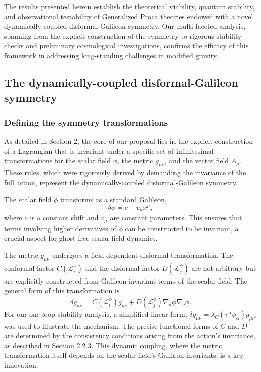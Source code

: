 \documentclass[twocolumn]{aastex631}
\begin{document}
The results presented herein establish the theoretical viability, quantum stability, and observational testability of Generalized Proca theories endowed with a novel dynamically-coupled disformal-Galileon symmetry. Our multi-faceted analysis, spanning from the explicit construction of the symmetry to rigorous stability checks and preliminary cosmological investigations, confirms the efficacy of this framework in addressing long-standing challenges in modified gravity.

\subsection{The dynamically-coupled disformal-Galileon symmetry}

\subsubsection{Defining the symmetry transformations}
As detailed in Section 2, the core of our proposal lies in the explicit construction of a Lagrangian that is invariant under a specific set of infinitesimal transformations for the scalar field $\phi$, the metric $g_{\mu\nu}$, and the vector field $A_\mu$. These rules, which were rigorously derived by demanding the invariance of the full action, represent the dynamically-coupled disformal-Galileon symmetry.

The scalar field $\phi$ transforms as a standard Galileon,
\begin{equation}
\delta \phi = c + v_\mu x^\mu,
\end{equation}
where $c$ is a constant shift and $v_\mu$ are constant parameters. This ensures that terms involving higher derivatives of $\phi$ can be constructed to be invariant, a crucial aspect for ghost-free scalar field dynamics.

The metric $g_{\mu\nu}$ undergoes a field-dependent disformal transformation. The conformal factor $C(\mathcal{L}_i^\phi)$ and the disformal factor $D(\mathcal{L}_j^\phi)$ are not arbitrary but are explicitly constructed from Galileon-invariant terms of the scalar field. The general form of this transformation is
\begin{equation}
\delta g_{\mu\nu} = C(\mathcal{L}_i^\phi) g_{\mu\nu} + D(\mathcal{L}_j^\phi) \nabla_\mu \phi \nabla_\nu \phi.
\end{equation}
For our one-loop stability analysis, a simplified linear form, $\delta g_{\mu\nu} = \lambda_C (v^\alpha \phi_\alpha) g_{\mu\nu}$, was used to illustrate the mechanism. The precise functional forms of $C$ and $D$ are determined by the consistency conditions arising from the action's invariance, as described in Section 2.2.3. This dynamic coupling, where the metric transformation itself depends on the scalar field's Galileon invariants, is a key innovation.
\end{document}
